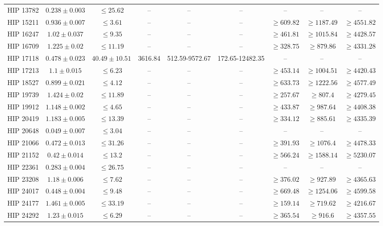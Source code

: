 {\begin{longtable}{|c|c|c|c|c|c|c|c|c|}
HIP 13782 & $ 0.238 \pm 0.003 $ & $\le 25.62 $ & -- & -- &-- & -- & -- & -- \\
HIP 15211 & $ 0.936 \pm 0.007 $ & $\le 3.61 $ &-- &-- &-- & $\ge 609.82 $ & $\ge 1187.49 $ & $\ge 4551.82 $ \\
HIP 16247 & $ 1.02 \pm 0.037 $ & $\le 9.35 $ &-- &-- &-- & $\ge 461.81 $ & $\ge 1015.84 $ & $\ge 4428.57 $ \\
HIP 16709 & $ 1.225 \pm 0.02 $ & $\le 11.19 $ &-- &-- &-- & $\ge 328.75 $ & $\ge 879.86 $ & $\ge 4331.28 $ \\
HIP 17118 & $ 0.478 \pm 0.023 $ & $ 40.49 \pm 10.51 $ & 3616.84 & 512.59-9572.67 & 172.65-12482.35 &-- &-- &-- \\
HIP 17213 & $ 1.1 \pm 0.015 $ & $\le 6.23 $ &-- &-- &-- & $\ge 453.14 $ & $\ge 1004.51 $ & $\ge 4420.43 $ \\
HIP 18527 & $ 0.899 \pm 0.021 $ & $\le 4.12 $ &-- &-- &-- & $\ge 633.73 $ & $\ge 1222.56 $ & $\ge 4577.49 $ \\
HIP 19739 & $ 1.424 \pm 0.02 $ & $\le 11.89 $ &-- &-- &-- & $\ge 257.67 $ & $\ge 807.4 $ & $\ge 4279.45 $ \\
HIP 19912 & $ 1.148 \pm 0.002 $ & $\le 4.65 $ &-- &-- &-- & $\ge 433.87 $ & $\ge 987.64 $ & $\ge 4408.38 $ \\
HIP 20419 & $ 1.183 \pm 0.005 $ & $\le 13.39 $ &-- &-- &-- & $\ge 334.12 $ & $\ge 885.61 $ & $\ge 4335.39 $ \\
HIP 20648 & $ 0.049 \pm 0.007 $ & $\le 3.04 $ & -- & -- &-- & -- & -- & -- \\
HIP 21066 & $ 0.472 \pm 0.013 $ & $\le 31.26 $ &-- &-- &-- & $\ge 391.93 $ & $\ge 1076.4 $ & $\ge 4478.33 $ \\
HIP 21152 & $ 0.42 \pm 0.014 $ & $\le 13.2 $ &-- &-- &-- & $\ge 566.24 $ & $\ge 1588.14 $ & $\ge 5230.07 $ \\
HIP 22361 & $ 0.283 \pm 0.004 $ & $\le 26.75 $ & -- & -- &-- & -- & -- & -- \\
HIP 23208 & $ 1.18 \pm 0.006 $ & $\le 7.62 $ &-- &-- &-- & $\ge 376.02 $ & $\ge 927.89 $ & $\ge 4365.63 $ \\
HIP 24017 & $ 0.448 \pm 0.004 $ & $\le 9.48 $ &-- &-- &-- & $\ge 669.48 $ & $\ge 1254.06 $ & $\ge 4599.58 $ \\
HIP 24177 & $ 1.461 \pm 0.005 $ & $\le 33.19 $ &-- &-- &-- & $\ge 159.14 $ & $\ge 719.62 $ & $\ge 4216.67 $ \\
HIP 24292 & $ 1.23 \pm 0.015 $ & $\le 6.29 $ &-- &-- &-- & $\ge 365.54 $ & $\ge 916.6 $ & $\ge 4357.55 $ \\

\end{longtable}}
